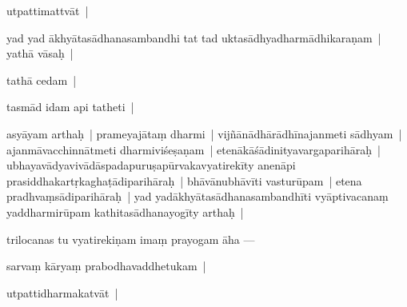 \documentclass[article,12pt,a4paper]{memoir}%
\newcommand{\persName}[1]{#1}
\newcounter{parCount}
\begin{document}
	  
	  \pstart \leavevmode%
	utpattimattvāt |
	{}
	\pend%
      

	  
	  \pstart \leavevmode%
	yad yad ākhyātasādhanasambandhi tat tad uktasādhyadharmādhikaraṇam | yathā vāsaḥ |
	{}
	\pend%
      

	  
	  \pstart \leavevmode%
	tathā cedam |
	{}
	\pend%
      

	  
	  \pstart \leavevmode%
	tasmād idam api tatheti |\label{sarit__ratnakīrtinibandhāvali__104267}
	{}
	\pend%
      

	  
	  \pstart \leavevmode%
	asyāyam arthaḥ | prameyajātaṃ dharmi | vijñānādhārādhīnajanmeti sādhyam | ajanmāvacchinnātmeti dharmiviśeṣaṇam | etenākāśādinityavargaparihāraḥ | ubhayavādyavivādāspadapuruṣapūrvakavya\leavevmode{}\label{RNAms_22b}tirekīty anenāpi prasiddhakartṛkaghaṭādiparihāraḥ | bhāvānubhāvīti vasturūpam | etena pradhvaṃsādiparihāraḥ | yad yadākhyātasādhanasambandhīti vyāptivacanaṃ yaddharmirūpam kathitasādhanayogīty arthaḥ |
	{}
	\pend%
      

	  
	  \pstart \leavevmode%
	\label{thakur75-39.28}\label{sarit__ratnakīrtinibandhāvali__104795}\persName{trilocanas} tu vyatirekiṇam imaṃ prayogam āha —
	{}
	\pend%
      

	  
	  \pstart \leavevmode%
	sarvaṃ kāryaṃ prabodhavaddhetukam |
	{}
	\pend%
      

	  
	  \pstart \leavevmode%
	utpattidharmakatvāt |
	{}
	\pend%
      
\end{document}

